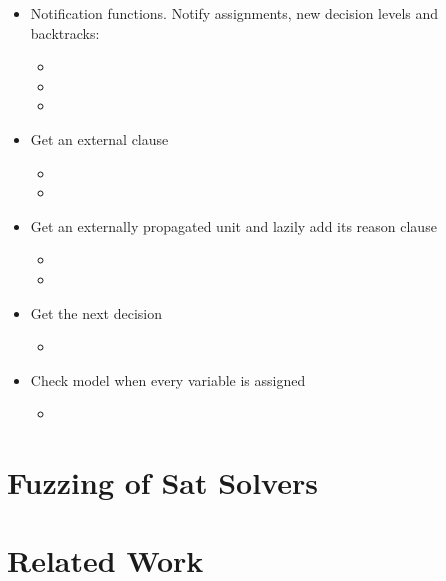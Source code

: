 \begin{itemize}
  \item Notification functions. Notify assignments, new decision levels and backtracks:
    \begin{itemize}
      \item {}
      \item {}
      \item {}
    \end{itemize}
  \item Get an external clause
    \begin{itemize}
      \item {}
      \item {}
    \end{itemize}
  \item Get an externally propagated unit and lazily add its reason clause
    \begin{itemize}
      \item {}
      \item {}
    \end{itemize}
  \item Get the next decision
    \begin{itemize}
      \item {}
    \end{itemize}
  \item Check model when every variable is assigned
    \begin{itemize}
      \item {}
    \end{itemize}
\end{itemize}

\section{Fuzzing of Sat Solvers}



\section{Related Work}


